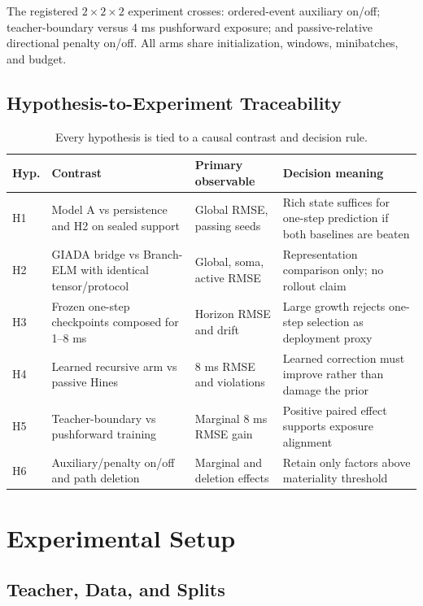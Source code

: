\documentclass[11pt]{article}
\begin{document}
The registered $2\times2\times2$ experiment crosses: ordered-event auxiliary
on/off; teacher-boundary versus 4 ms pushforward exposure; and
passive-relative directional penalty on/off. All arms share initialization,
windows, minibatches, and budget.

\subsection{Hypothesis-to-Experiment Traceability}

\begin{table}[t]
\centering
\caption{Every hypothesis is tied to a causal contrast and decision rule.}
\label{tab:hypothesis-map}
\small
\begin{tabularx}{\textwidth}{p{0.8cm}YYp{3.2cm}}
\toprule
Hyp. & Contrast & Primary observable & Decision meaning \\
\midrule
H1 & Model A vs persistence and H2 on sealed support & Global RMSE, passing seeds
& Rich state suffices for one-step prediction if both baselines are beaten \\
H2 & GIADA bridge vs Branch-ELM with identical tensor/protocol & Global,
soma, active RMSE & Representation comparison only; no rollout claim \\
H3 & Frozen one-step checkpoints composed for 1--8 ms & Horizon RMSE and drift &
Large growth rejects one-step selection as deployment proxy \\
H4 & Learned recursive arm vs passive Hines & 8 ms RMSE and violations & Learned
correction must improve rather than damage the prior \\
H5 & Teacher-boundary vs pushforward training & Marginal 8 ms RMSE gain &
Positive paired effect supports exposure alignment \\
H6 & Auxiliary/penalty on/off and path deletion & Marginal and deletion effects &
Retain only factors above materiality threshold \\
\bottomrule
\end{tabularx}
\end{table}

\section{Experimental Setup}

\subsection{Teacher, Data, and Splits}
\end{document}
